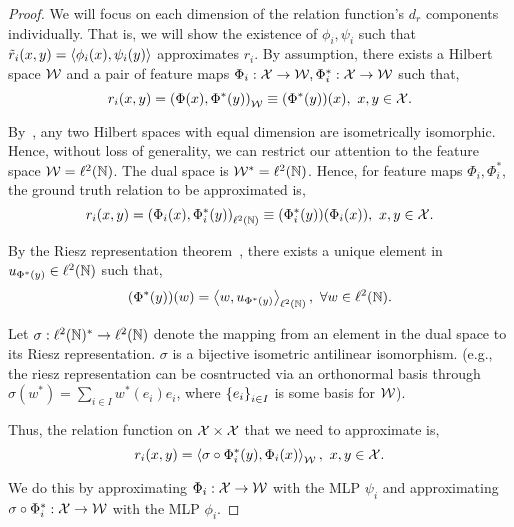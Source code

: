 \begin{proof}
    \hphantom{~}

    We will focus on each dimension of the relation function's $d_r$ components individually. That is, we will show the existence of $\phi_i, \psi_i$ such that $\tilde{r}_i(x, y) = \left \langle \phi_i(x), \psi_i(y) \right\rangle$ approximates $r_i$. By assumption, there exists a Hilbert space ${\mathcal{W}}$ and a pair of feature maps $\Phi_i: {\mathcal{X}} \to {\mathcal{W}}, \Phi_i^*: {\mathcal{X}} \to {\mathcal{W}}$ such that,
    \begin{equation*}
        r_i(x, y) = \left(\Phi(x), \Phi^*(y)\right)_{{\mathcal{W}}} \equiv (\Phi^*(y))(x), \ x, y \in {\mathcal{X}}.
    \end{equation*}

    By~\citep{}, any two Hilbert spaces with equal dimension are isometrically isomorphic. Hence, without loss of generality, we can restrict our attention to the feature space ${\mathcal{W}} = \ell^2({\mathbb{N}})$. The dual space is ${\mathcal{W}}^* = \ell^2({\mathbb{N}})$. Hence, for feature maps $\Phi_i, \Phi_i^*$, the ground truth relation to be approximated is,
    \begin{equation*}
        r_i(x, y) = \left(\Phi_i(x), \Phi_i^*(y)\right)_{\ell^2({\mathbb{N}})} \equiv (\Phi_i^*(y))(\Phi_i(x)), \ x, y \in {\mathcal{X}}.
    \end{equation*}

    By the Riesz representation theorem~\citep{riesz_citation}, there exists a unique element in $u_{\Phi^*(y)} \in \ell^2({\mathbb{N}})$ such that,
    \begin{equation*}
        (\Phi^*(y))(w) = \left \langle w, u_{\Phi^*(y)} \right\rangle_{\ell^2({\mathbb{N}})}, \ \forall w \in \ell^2({\mathbb{N}}).
    \end{equation*}

    Let $\sigma: \ell^2({\mathbb{N}})^* \to \ell^2({\mathbb{N}})$ denote the mapping from an element in the dual space to its Riesz representation. $\sigma$ is a bijective isometric antilinear isomorphism. (e.g., the riesz representation can be cosntructed via an orthonormal basis through $\sigma(w^*) = \sum_{i \in I} w^{*}(e_i) e_i$, where $\left\{e_i\right\}_{i \in I}$ is some basis for ${\mathcal{W}}$).

    Thus, the relation function on ${\mathcal{X}} \times {\mathcal{X}}$ that we need to approximate is,
    \begin{equation*}
        r_i(x, y) = \left \langle \sigma \circ \Phi_i^* (y), \Phi_i(x) \right\rangle_{{\mathcal{W}}}, \ x, y \in {\mathcal{X}}.
    \end{equation*}

    We do this by approximating $\Phi_i: {\mathcal{X}} \to {\mathcal{W}}$ with the MLP $\psi_i$ and approximating $\sigma \circ \Phi_i^*: {\mathcal{X}} \to {\mathcal{W}}$ with the MLP $\phi_i$.


\end{proof}
